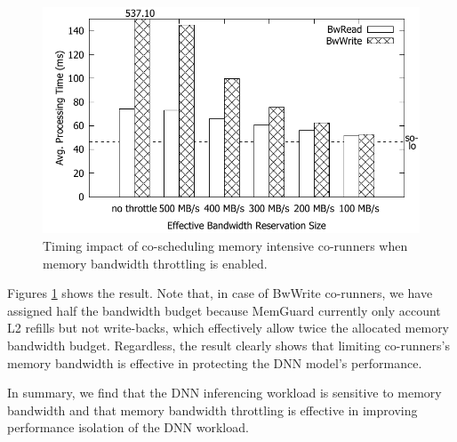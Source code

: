 \begin{figure}[h]
  \centering
  \includegraphics[width=.45\textwidth]{figs/memguard_bandwidth}
  \caption{Timing impact of co-scheduling memory intensive
co-runners when memory bandwidth throttling is enabled. }
  \label{fig:memguard_bandwidth}
\end{figure}

Figures \ref{fig:memguard_bandwidth} shows the result.
Note that, in case of BwWrite co-runners, we have assigned half the
bandwidth budget because MemGuard currently only account L2 refills
but not write-backs, which effectively allow twice the allocated
memory bandwidth budget. Regardless, the result clearly shows that
limiting co-runners's memory bandwidth is effective in protecting the
DNN model's performance.

In summary, we find that the DNN inferencing workload is sensitive to
memory bandwidth and that memory bandwidth throttling is effective in
improving performance isolation of the DNN workload.





